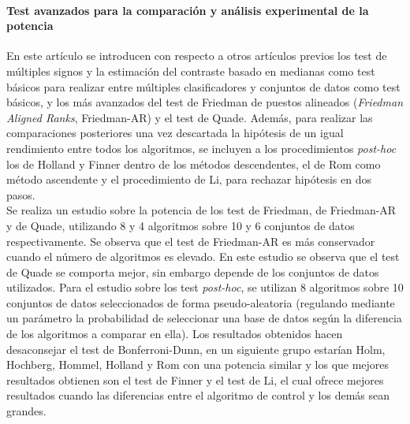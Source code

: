 	\paragraph{Test avanzados para la comparación y análisis 
experimental de la potencia} \cite{GARCIA10} En este
artículo se introducen con respecto a otros artículos 
previos los test de múltiples signos y la estimación del 
contraste basado en medianas como test básicos para realizar
entre múltiples clasificadores y conjuntos de datos como 
test básicos, y los más avanzados del test de Friedman
de puestos alineados (\textit{Friedman Aligned Ranks}, 
Friedman-AR) y el test de Quade. Además, para realizar las 
comparaciones  posteriores  una vez descartada la hipótesis 
de un igual  rendimiento entre todos los algoritmos, se 
incluyen a los  procedimientos \textit{post-hoc} los de 
Holland y Finner  dentro de  los métodos descendentes, el de 
Rom como método  ascendente y el procedimiento de Li, para 
rechazar hipótesis en dos pasos.\\
	Se realiza un estudio sobre la potencia de los test
de Friedman, de Friedman-AR y de Quade, utilizando 8 y 4
algoritmos sobre 10 y 6 conjuntos de datos respectivamente. 
Se observa que el test de Friedman-AR es más conservador
cuando el número de algoritmos es elevado. En este estudio
se observa que el test de Quade se comporta mejor, sin
embargo depende de los conjuntos de datos utilizados. Para
el estudio sobre los test \textit{post-hoc}, se utilizan
8 algoritmos sobre 10 conjuntos de datos seleccionados
de forma pseudo-aleatoria (regulando mediante un parámetro la 
probabilidad de seleccionar una base de datos según la 
diferencia de los algoritmos a comparar en ella). Los 
resultados obtenidos hacen desaconsejar el test de 
Bonferroni-Dunn, en un siguiente grupo estarían Holm, 
Hochberg, Hommel, Holland y Rom con una potencia similar
y los que mejores resultados obtienen son el test de Finner
y el test de Li, el cual ofrece mejores resultados 
cuando las diferencias entre el algoritmo de control y los 
demás sean grandes.

	
